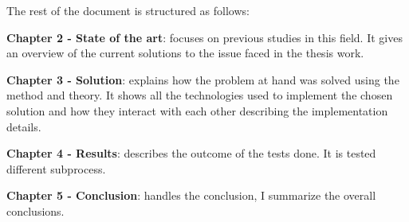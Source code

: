 The rest of the document is structured as follows:
\begin{outline}
    \1 \textbf{Chapter 2 - State of the art}: focuses on previous studies in this field. It gives an overview of the 
    current solutions to the issue faced in the thesis work. 

    \1 \textbf{Chapter 3 - Solution}: explains how the problem at hand was solved using the method and theory. It 
    shows all the technologies used to implement the chosen solution and how they interact with each other describing 
    the implementation details. 

    \1 \textbf{Chapter 4 - Results}: describes the outcome of the tests done. It is tested different subprocess.

    \1 \textbf{Chapter 5 - Conclusion}: handles the conclusion, I summarize the overall conclusions.
    
\end{outline}